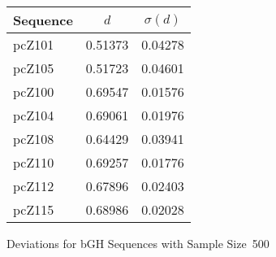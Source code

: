 \begin{figure}
\centering
\begin{singlespace}
    \begin{tabular}{lcc}
        \toprule
        \textbf{Sequence} & $d$ & $\sigma(d)$\\
        \midrule
        pcZ101 & 0.51373 & 0.04278 \\
        pcZ105 & 0.51723 & 0.04601 \\
        \midrule
        pcZ100 & 0.69547 & 0.01576 \\
        pcZ104 & 0.69061 & 0.01976 \\
        pcZ108 & 0.64429 & 0.03941 \\
        pcZ110 & 0.69257 & 0.01776 \\
        pcZ112 & 0.67896 & 0.02403 \\
        pcZ115 & 0.68986 & 0.02028 \\
        \bottomrule
    \end{tabular}
    \caption{Deviations for bGH Sequences with Sample Size~500}
    \label{bgh:deviation}
\end{singlespace}
\end{figure}
